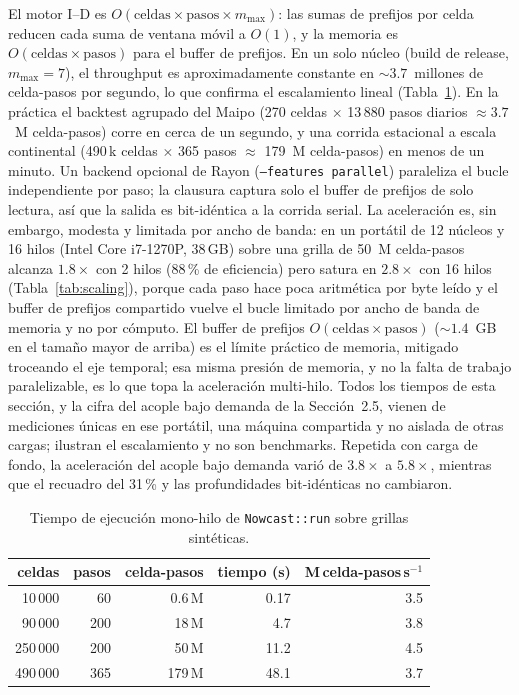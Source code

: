 \documentclass[authoryear,preprint,review,12pt]{elsarticle}
\begin{document}
El motor I--D es $O(\mathrm{celdas}\times\mathrm{pasos}\times m_{\max})$: las sumas
de prefijos por celda reducen cada suma de ventana móvil a $O(1)$, y la memoria es
$O(\mathrm{celdas}\times\mathrm{pasos})$ para el buffer de prefijos. En un solo
núcleo (build de release, $m_{\max}=7$), el throughput es aproximadamente constante
en ${\sim}3.7$~millones de celda-pasos por segundo, lo que confirma el escalamiento
lineal (Tabla~\ref{tab:perf}). En la práctica el backtest agrupado del Maipo (270
celdas $\times$ 13\,880 pasos diarios $\approx 3.7$~M celda-pasos) corre en cerca
de un segundo, y una corrida estacional a escala continental (490\,k celdas
$\times$ 365 pasos $\approx$ 179~M celda-pasos) en menos de un minuto. Un backend
opcional de Rayon (\texttt{--features parallel}) paraleliza el bucle independiente
por paso; la clausura captura solo el buffer de prefijos de solo lectura, así que
la salida es bit-idéntica a la corrida serial. La aceleración es, sin embargo,
modesta y limitada por ancho de banda: en un portátil de 12 núcleos y 16 hilos (Intel Core i7-1270P, 38\,GB) sobre una
grilla de 50~M celda-pasos alcanza $1.8\times$ con 2 hilos (88\,\% de eficiencia)
pero satura en $2.8\times$ con 16 hilos (Tabla~\ref{tab:scaling}), porque cada paso
hace poca aritmética por byte leído y el buffer de prefijos compartido vuelve el
bucle limitado por ancho de banda de memoria y no por cómputo. El buffer de
prefijos $O(\mathrm{celdas}\times\mathrm{pasos})$ (${\sim}1.4$~GB en el tamaño
mayor de arriba) es el límite práctico de memoria, mitigado troceando el eje
temporal; esa misma presión de memoria, y no la falta de trabajo paralelizable, es
lo que topa la aceleración multi-hilo. Todos los tiempos de esta sección, y la cifra
del acople bajo demanda de la Sección~2.5, vienen de mediciones únicas en ese
portátil, una máquina compartida y no aislada de otras cargas; ilustran el escalamiento
y no son benchmarks. Repetida con carga de fondo, la aceleración del acople bajo
demanda varió de $3.8\times$ a $5.8\times$, mientras que el recuadro del 31\,\% y las
profundidades bit-idénticas no cambiaron.

\begin{table}[ht]
\centering
\caption{Tiempo de ejecución mono-hilo de \texttt{Nowcast::run} sobre grillas sintéticas.}
\label{tab:perf}
\begin{tabular}{@{}rrrrr@{}}
\toprule
celdas & pasos & celda-pasos & tiempo (s) & M\,celda-pasos\,s$^{-1}$ \\
\midrule
10\,000  & 60  & 0.6\,M   & 0.17  & 3.5 \\
90\,000  & 200 & 18\,M    & 4.7   & 3.8 \\
250\,000 & 200 & 50\,M    & 11.2  & 4.5 \\
490\,000 & 365 & 179\,M   & 48.1  & 3.7 \\
\bottomrule
\end{tabular}
\end{table}
\end{document}
